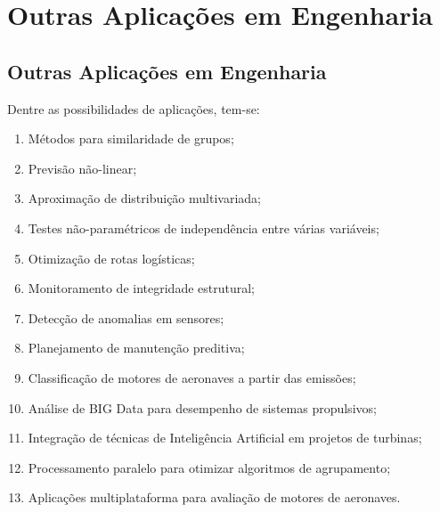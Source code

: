 \documentclass[12pt]{article} %
\begin{document}
	
	\newpage
	\chapter{Outras Aplicações em Engenharia}
	
		\section{Outras Aplicações em Engenharia}\label{sec:OutrasAplicacoesEmEngenharia}
		
		Dentre as possibilidades de aplicações, tem-se:
		
		\begin{enumerate}
	                \item Métodos para similaridade de grupos;
	
	                \item Previsão não-linear;
	
	                \item Aproximação de distribuição multivariada;
	
	                \item Testes não-paramétricos de independência entre várias variáveis;
	
	                \item Otimização de rotas logísticas;
	
	                \item Monitoramento de integridade estrutural;
	
	                \item Detecção de anomalias em sensores;
	
	                \item Planejamento de manutenção preditiva;
	
	                \item Classificação de motores de aeronaves a partir das emissões;
	
	                \item Análise de BIG Data para desempenho de sistemas propulsivos;
	
	                \item Integração de técnicas de Inteligência Artificial em projetos de turbinas;
	
	                \item Processamento paralelo para otimizar algoritmos de agrupamento;
	
	                \item Aplicações multiplataforma para avaliação de motores de aeronaves.
	        \end{enumerate}
	
\end{document}
